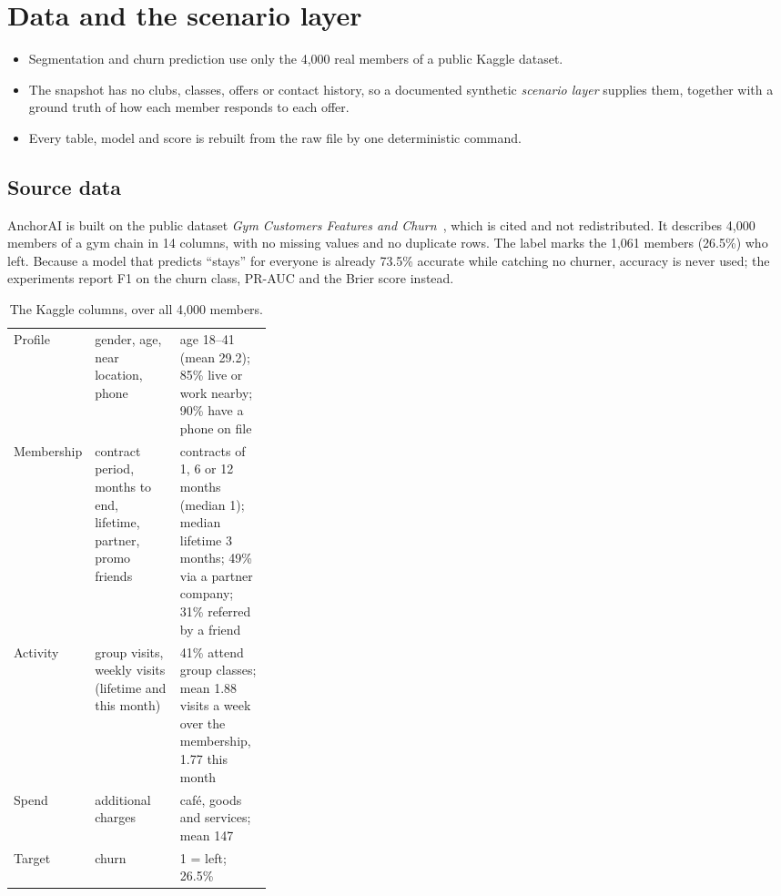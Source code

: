 \chapter{Data and the scenario layer}
\label{ch:data}

\begin{inbrief}
\begin{itemize}
  \item Segmentation and churn prediction use only the 4,000 real members of a public Kaggle dataset.
  \item The snapshot has no clubs, classes, offers or contact history, so a documented synthetic \emph{scenario layer} supplies them, together with a ground truth of how each member responds to each offer.
  \item Every table, model and score is rebuilt from the raw file by one deterministic command.
\end{itemize}
\end{inbrief}

\section{Source data}

AnchorAI is built on the public dataset \emph{Gym Customers Features and Churn}~\cite{vinueza-gym}, which is cited and not redistributed. It describes 4,000 members of a gym chain in 14 columns, with no missing values and no duplicate rows. The label  marks the 1,061 members (26.5\%) who left. Because a model that predicts \enquote{stays} for everyone is already 73.5\% accurate while catching no churner, accuracy is never used; the experiments report F1 on the churn class, PR-AUC and the Brier score instead.

\begin{table}[tb]
  \caption{The Kaggle columns, over all 4,000 members.}
  \label{tab:kaggle}
  \begin{tabularx}{\linewidth}{@{}l P{0.33\linewidth} L@{}}
    \toprule
     &  &  \\
    \midrule
    Profile    & gender, age, near location, phone & age 18--41 (mean 29.2); 85\% live or work nearby; 90\% have a phone on file \\
    Membership & contract period, months to end, lifetime, partner, promo friends & contracts of 1, 6 or 12 months (median 1); median lifetime 3 months; 49\% via a partner company; 31\% referred by a friend \\
    Activity   & group visits, weekly visits (lifetime and this month) & 41\% attend group classes; mean 1.88 visits a week over the membership, 1.77 this month \\
    Spend      & additional charges & café, goods and services; mean 147 \\
    Target     & churn & 1 = left; 26.5\% \\
    \bottomrule
  \end{tabularx}
\end{table}

